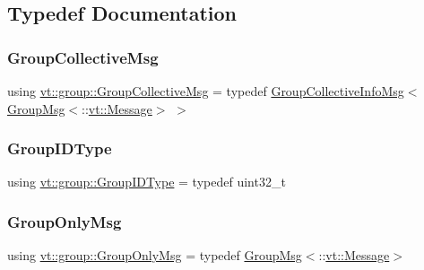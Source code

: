 \subsection{Typedef Documentation}
\mbox{\label{namespacevt_1_1group_a4c1183efe0185992fefb3ab38a55a8a7}} 
\subsubsection{\texorpdfstring{Group\+Collective\+Msg}{GroupCollectiveMsg}}
{\footnotesize\ttfamily using \hyperlink{namespacevt_1_1group_a4c1183efe0185992fefb3ab38a55a8a7}{vt\+::group\+::\+Group\+Collective\+Msg} = typedef \hyperlink{structvt_1_1group_1_1_group_collective_info_msg}{Group\+Collective\+Info\+Msg}$<$\hyperlink{structvt_1_1group_1_1_group_msg}{Group\+Msg}$<$\+::\hyperlink{namespacevt_a3a3ddfef40b4c90915fa43cdd5f129ea}{vt\+::\+Message}$>$ $>$}

\mbox{\label{namespacevt_1_1group_a805a6643787ae841525c371fd0cefeb3}} 
\subsubsection{\texorpdfstring{Group\+I\+D\+Type}{GroupIDType}}
{\footnotesize\ttfamily using \hyperlink{namespacevt_1_1group_a805a6643787ae841525c371fd0cefeb3}{vt\+::group\+::\+Group\+I\+D\+Type} = typedef uint32\+\_\+t}

\mbox{\label{namespacevt_1_1group_a864fcf6bc821eacf8350bf4ad15e51b3}} 
\subsubsection{\texorpdfstring{Group\+Only\+Msg}{GroupOnlyMsg}}
{\footnotesize\ttfamily using \hyperlink{namespacevt_1_1group_a864fcf6bc821eacf8350bf4ad15e51b3}{vt\+::group\+::\+Group\+Only\+Msg} = typedef \hyperlink{structvt_1_1group_1_1_group_msg}{Group\+Msg}$<$\+::\hyperlink{namespacevt_a3a3ddfef40b4c90915fa43cdd5f129ea}{vt\+::\+Message}$>$}

